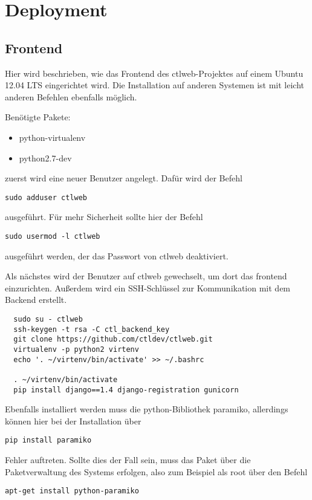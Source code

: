 \section{Deployment}
\subsection{Frontend}
Hier wird beschrieben, wie das Frontend des ctlweb-Projektes auf einem Ubuntu
12.04 LTS eingerichtet wird. Die Installation auf anderen Systemen ist mit
leicht anderen Befehlen ebenfalls möglich.

Benötigte Pakete: \begin{itemize}
  \item python-virtualenv
  \item python2.7-dev
\end{itemize}

zuerst wird eine neuer Benutzer angelegt. Dafür wird der Befehl
\begin{lstlisting}
sudo adduser ctlweb
\end{lstlisting}
ausgeführt. Für mehr Sicherheit sollte hier der Befehl
\begin{lstlisting}
sudo usermod -l ctlweb
\end{lstlisting}
ausgeführt werden, der das Passwort von ctlweb deaktiviert.

Als nächstes wird der Benutzer auf ctlweb gewechselt, um dort das frontend
einzurichten. Außerdem wird ein SSH-Schlüssel zur Kommunikation mit dem Backend
erstellt. 
\begin{lstlisting}
  sudo su - ctlweb
  ssh-keygen -t rsa -C ctl_backend_key
  git clone https://github.com/ctldev/ctlweb.git
  virtualenv -p python2 virtenv
  echo '. ~/virtenv/bin/activate' >> ~/.bashrc

  . ~/virtenv/bin/activate
  pip install django==1.4 django-registration gunicorn
\end{lstlisting}
Ebenfalls installiert werden muss die python-Bibliothek paramiko, allerdings
können hier bei der Installation über 
\begin{lstlisting}
pip install paramiko
\end{lstlisting}
Fehler auftreten. Sollte dies der Fall sein, muss das Paket über die
Paketverwaltung des Systems erfolgen, also zum Beispiel als root über den
Befehl
\begin{lstlisting}
apt-get install python-paramiko
\end{lstlisting}

